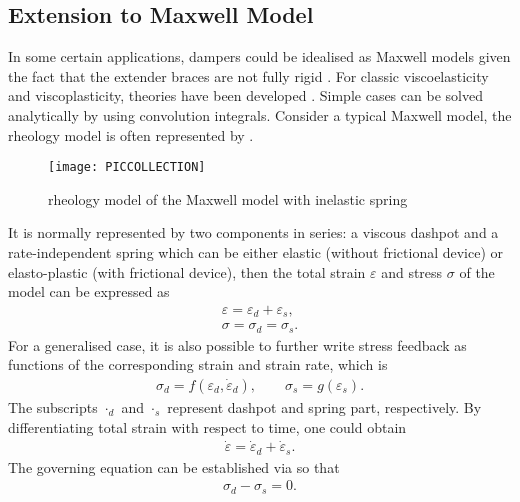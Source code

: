 \subsection{Extension to Maxwell Model}
In some certain applications, dampers could be idealised as Maxwell models given the fact that the extender braces are not fully rigid \citep[see, e.g.,][]{Makris1991}. For classic viscoelasticity and viscoplasticity, theories have been developed \citep{Simo1998}. Simple cases can be solved analytically by using convolution integrals. Consider a typical Maxwell model, the rheology model is often represented by .
\begin{figure}[ht]
\centering\scriptsize
\texttt{[image: PICCOLLECTION]}
\caption{rheology model of the Maxwell model with inelastic spring}\label{fig:rheology_maxwell}
\end{figure}
It is normally represented by two components in series: a viscous dashpot and a rate-independent spring which can be either elastic (without frictional device) or elasto-plastic (with frictional device), then the total strain $\varepsilon$ and stress $\sigma$ of the model can be expressed as
\begin{gather}\label{eq:equal_strain}
\varepsilon=\varepsilon_d+\varepsilon_s,\\\label{eq:equal_stress}
\sigma=\sigma_d=\sigma_s.
\end{gather}
For a generalised case, it is also possible to further write stress feedback as functions of the corresponding strain and strain rate, which is
\begin{gather}
\sigma_d=f(\varepsilon_d,\dot\varepsilon_d),\qquad\sigma_s=g(\varepsilon_s).
\end{gather}
The subscripts $\cdot_d$ and $\cdot_s$ represent dashpot and spring part, respectively. By differentiating total strain with respect to time, one could obtain
\begin{gather}\label{eq:equal_strain_rate}
\dot\varepsilon=\dot\varepsilon_d+\dot\varepsilon_s.
\end{gather}
The governing equation can be established via  so that
\begin{gather}\label{eq:governing_equation}
\sigma_d-\sigma_s=0.
\end{gather}
